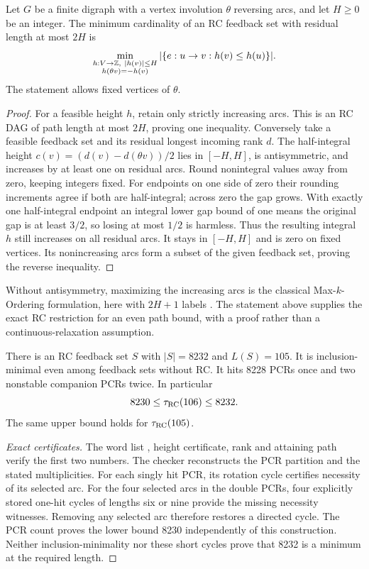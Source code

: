 \begin{theorem}
\label{thm:height-formulation}
Let $G$ be a finite digraph with a vertex involution $\theta$ reversing
arcs, and let $H\ge0$ be an integer. The minimum cardinality of an
RC feedback set with residual length at most $2H$ is
\[
 \min_{\substack{h:V\to\mathbb Z,\ |h(v)|\le H\\h(\theta v)=-h(v)}}
       |\{e:u\to v:h(v)\le h(u)\}|.
\]
The statement allows fixed vertices of $\theta$.
\end{theorem}
\begin{proof}
For a feasible height $h$, retain only strictly increasing arcs.
This is an RC DAG of path length at most $2H$, proving one
inequality. Conversely take a feasible feedback set and its
residual longest incoming rank $d$. The half-integral height
$c(v)=(d(v)-d(\theta v))/2$ lies in $[-H,H]$, is antisymmetric,
and increases by at least one on residual arcs. Round nonintegral
values away from zero, keeping integers fixed. For endpoints on
one side of zero their rounding increments agree if both are
half-integral; across zero the gap grows. With exactly one
half-integral endpoint an integral lower gap bound of one means
the original gap is at least $3/2$, so losing at most $1/2$
is harmless. Thus the resulting integral $h$ still increases
on all residual arcs. It stays in $[-H,H]$ and is zero on fixed
vertices. Its nonincreasing arcs form a subset of the given
feedback set, proving the reverse inequality.
\end{proof}
Without antisymmetry, maximizing the increasing arcs is the
classical Max-$k$-Ordering formulation, here with $2H+1$ labels
\cite{KenkreEtAl2015}. The statement above supplies the exact
RC restriction for an even path bound, with a proof rather than
a continuous-relaxation assumption.

\begin{proposition}
\label{prop:8232}
There is an RC feedback set $S$ with $|S|=8232$ and $L(S)=105$.
It is inclusion-minimal even among feedback sets without RC.
It hits 8228 PCRs once and two nonstable companion PCRs twice.
In particular
\[
 8230\le\tau_{\operatorname{RC}}(106)\le8232.
\]
The same upper bound holds for $\tau_{\operatorname{RC}}(105)$.
\end{proposition}
\begin{proof}[Exact certificates]
The word list , height
certificate, rank and attaining path verify the first two numbers.
The checker reconstructs the PCR partition and the stated
multiplicities. For each singly hit PCR, its rotation cycle
certifies necessity of its selected arc. For the four selected
arcs in the double PCRs, four explicitly stored one-hit cycles
of lengths six or nine provide the missing necessity witnesses.
Removing any selected arc therefore restores a directed cycle.
The PCR count proves the lower bound 8230 independently of this
construction. Neither inclusion-minimality nor these short cycles
prove that 8232 is a minimum at the required length.
\end{proof}

